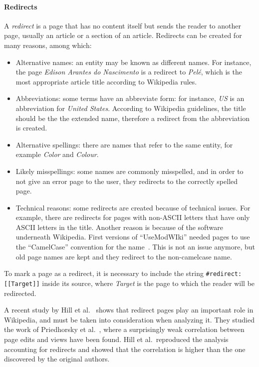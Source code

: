 \paragraph{Redirects}
A \emph{redirect} is a page that has no content itself but sends the reader to another page, usually an article or a section of an article.
Redirects can be created for many reasons, among which:

\begin{itemize}
    \item Alternative names: an entity may be known as different names.
    For instance, the page \emph{Edison Arantes do Nascimento} is a redirect to \emph{Pelé}, which is the most appropriate article title according to Wikipedia rules.
    \item Abbreviations: some terms have an abbreviate form: for instance, \emph{US} is an abbreviation for \emph{United States}.
    According to Wikipedia guidelines, the title should be the the extended name, therefore a redirect from the abbreviation is created.
    \item Alternative spellings: there are names that refer to the same entity, for example \emph{Color} and \emph{Colour}.
    \item Likely misspellings: some names are commonly misspelled, and in order to not give an error page to the user, they redirects to the correctly spelled page.
    \item Technical reasons: some redirects are created because of technical issues.
    For example, there are redirects for pages with non-ASCII letters that have only ASCII letters in the title.
    Another reason is because of the software underneath Wikipedia.
    First versions of ``UseModWIki'' needed pages to use the ``CamelCase'' convention for the name~\cite{wiki:camelcase}.
    This is not an issue anymore, but old page names are kept and they redirect to the non-camelcase name.
\end{itemize}

To mark a page as a redirect, it is necessary to include the string
\texttt{#redirect: [[Target]]} inside its source, where \emph{Target} is the page to which the reader will be redirected.

A recent study by Hill et al.~\cite{Hill2014} shows that redirect pages play an important role in Wikipedia, and must be taken into consideration when analyzing it.
They studied the work of Priedhorsky et al.~\cite{Priedhorsky2007}, where a surprisingly weak correlation between page edits and views have been found.
Hill et al.\ reproduced the analysis accounting for redirects and showed that the correlation is higher than the one discovered by the original authors.

